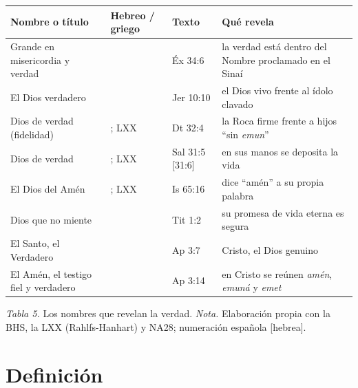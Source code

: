 \begin{center}\small\renewcommand{\arraystretch}{1.22}
\begin{tabular}{@{}L{3.3cm}L{3.7cm}L{2.4cm}L{5.0cm}@{}}
\toprule
\textbf{Nombre o título} & \textbf{Hebreo / griego} & \textbf{Texto} & \textbf{Qué revela} \\ \midrule
Grande en misericordia y verdad &  & Éx 34:6 & la verdad está dentro del Nombre proclamado en el Sinaí \\
El Dios verdadero &  & Jer 10:10 & el Dios vivo frente al ídolo clavado \\
Dios de verdad (fidelidad) & ; LXX  & Dt 32:4 & la Roca firme frente a hijos ``sin \emph{emun}'' \\
Dios de verdad & ; LXX  & Sal 31:5 [31:6] & en sus manos se deposita la vida \\
El Dios del Amén & ; LXX  & Is 65:16 & dice ``amén'' a su propia palabra \\
Dios que no miente &  & Tit 1:2 & su promesa de vida eterna es segura \\
El Santo, el Verdadero &  & Ap 3:7 & Cristo, el Dios genuino \\
El Amén, el testigo fiel y verdadero &  & Ap 3:14 & en Cristo se reúnen \emph{amén}, \emph{emuná} y \emph{emet} \\
\bottomrule
\end{tabular}\par
{\footnotesize\color{gris}\textit{Tabla 5.} Los nombres que revelan la verdad. \textit{Nota.} Elaboración propia con la BHS, la LXX (Rahlfs-Hanhart) y NA28; numeración española [hebrea].}
\end{center}


\section{Definición}

